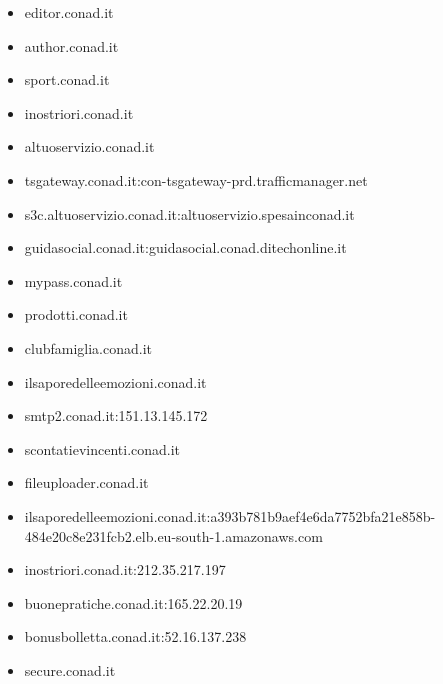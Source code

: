 \documentclass{article}
\begin{document}
\begin{itemize}
        \item editor.conad.it
    
        \item author.conad.it
    
        \item sport.conad.it
    
        \item inostriori.conad.it
    
        \item altuoservizio.conad.it
    
        \item tsgateway.conad.it:con-tsgateway-prd.trafficmanager.net
    
        \item s3c.altuoservizio.conad.it:altuoservizio.spesainconad.it
    
        \item guidasocial.conad.it:guidasocial.conad.ditechonline.it
    
        \item mypass.conad.it
    
        \item prodotti.conad.it
    
        \item clubfamiglia.conad.it
    
        \item ilsaporedelleemozioni.conad.it
    
        \item smtp2.conad.it:151.13.145.172
    
        \item scontatievincenti.conad.it
    
        \item fileuploader.conad.it
    
        \item ilsaporedelleemozioni.conad.it:a393b781b9aef4e6da7752bfa21e858b-484e20c8e231fcb2.elb.eu-south-1.amazonaws.com
    
        \item inostriori.conad.it:212.35.217.197
    
        \item buonepratiche.conad.it:165.22.20.19
    
        \item bonusbolletta.conad.it:52.16.137.238
    
        \item secure.conad.it
    

\end{itemize}
\end{document}
